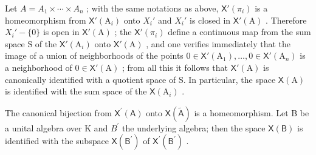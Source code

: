 Let \(A = A_{1} \times \cdots \times A_{n}\) ; with the same notations as above, \(\mathsf{X}'(\pi_{i})\) is a homeomorphism from \(\mathsf{X}'(\mathrm{A}_{i})\) onto \(X_{i}'\) and \(X_{i}'\) is closed in \(\mathsf{X}'(\mathrm{A})\) . Therefore \(X_{i}' - \{0\}\) is open in \(\mathsf{X}'(\mathrm{A})\) ; the \(\mathsf{X}'(\pi_{i})\) define a continuous map from the sum space S of the \(\mathsf{X}'(\mathrm{A}_{i})\) onto \(\mathsf{X}'(\mathrm{A})\) , and one verifies immediately that the image of a union of neighborhoods of the points \(0 \in \mathsf{X}'(\mathrm{A}_{1}), \ldots, 0 \in \mathsf{X}'(\mathrm{A}_{n})\) is a neighborhood of \(0 \in \mathsf{X}'(\mathrm{A})\) ; from all this it follows that \(\mathsf{X}'(\mathrm{A})\) is canonically identified with a quotient space of S. In particular, the space \(\mathsf{X}(\mathrm{A})\) is identified with the sum space of the \(\mathsf{X}(\mathrm{A}_{i})\) .

The canonical bijection from \(\mathsf{X}^{\prime}(\mathsf{A})\) onto \(\mathsf{X}(\tilde{\mathsf{A}})\) is a homeomorphism. Let B be a unital algebra over K and \(B^{\prime}\) the underlying algebra; then the space \(\mathsf{X}(\mathsf{B})\) is identified with the subspace \(\mathsf{X}(\mathsf{B}^{\prime})\) of \(\mathsf{X}^{\prime}(\mathsf{B}^{\prime})\) .

